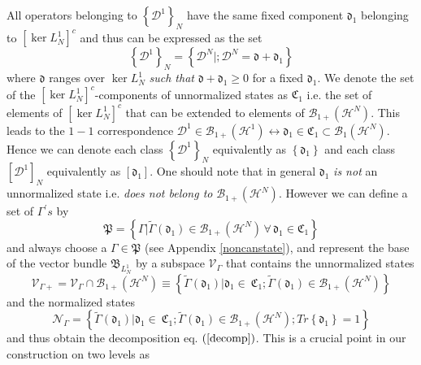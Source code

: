 \documentclass[aps,preprint]{revtex4}%
\begin{document}
All operators belonging to $\left\{  \mathcal{D}^{1}\right\}  _{N}$ have the
same fixed component $\mathfrak{d}_{1}$ belonging to $\left[  \ker L_{N}%
^{1}\right]  ^{c}$ and thus can be expressed as the set%
\begin{equation}
\left\{  \mathcal{D}^{1}\right\}  _{N}=\left\{  \mathcal{D}^{N}|;\mathcal{D}%
^{N}=\mathfrak{d}+\mathfrak{d}_{1}\right\}
\end{equation}
where $\mathfrak{d}$ ranges over $\ker L_{N}^{1}$ \emph{such that
}$\mathfrak{d}+\mathfrak{d}_{1}\geq0$ for a fixed $\mathfrak{d}_{1}$. We
denote the set of the $\left[  \ker L_{N}^{1}\right]  ^{c}$-components of
unnormalized states as $\mathfrak{C}_{1}$ i.e. the set of elements of $\left[
\ker L_{N}^{1}\right]  ^{c}$ that can be extended to elements of
$\mathcal{B}_{1+}\left(  \mathcal{H}^{N}\right)  $. This leads to the $1-1$
correspondence $\mathcal{D}^{1}\in\mathcal{B}_{1+}\left(  \mathcal{H}%
^{1}\right)  \leftrightarrow\mathfrak{d}_{1}\in\mathfrak{C}_{1}\subset
\mathcal{B}_{1}\left(  \mathcal{H}^{N}\right)  $. Hence we can denote each
class $\left\{  \mathcal{D}^{1}\right\}  _{N}$ equivalently as $\left\{
\mathfrak{d}_{1}\right\}  $ and each class $\left[  \mathcal{D}^{1}\right]
_{N}$ equivalently as $\left[  \mathfrak{d}_{1}\right]  $. One should note
that in general $\mathfrak{d}_{1}$ \emph{is not} an unnormalized state i.e.
\emph{does not belong to }$\mathcal{B}_{1+}\left(  \mathcal{H}^{N}\right)  $.
However we can define a set of $\Gamma^{\prime}s$ by
\begin{equation}
\mathfrak{P}=\left\{  \Gamma|\tilde{\Gamma}\left(  \mathfrak{d}_{1}\right)
\in\mathcal{B}_{1+}\left(  \mathcal{H}^{N}\right)  \,\forall\,\mathfrak{d}%
_{1}\in\mathfrak{C}_{1}\right\}
\end{equation}
and always choose a $\Gamma\in\mathfrak{P}$ (see Appendix \ref{noncanstate}),
and represent the base of the vector bundle $\mathfrak{B}_{L_{N}^{1}}$ by a
subspace $\mathcal{V}_{\Gamma}$ that contains the unnormalized states
\begin{equation}
\mathcal{V}_{\Gamma+}=\mathcal{V}_{\Gamma}\cap\mathcal{B}_{1+}\left(
\mathcal{H}^{N}\right)  \equiv\left\{  \tilde{\Gamma}\left(  \mathfrak{d}%
_{1}\right)  |\mathfrak{d}_{1}\in\ \mathfrak{C}_{1};\tilde{\Gamma}\left(
\mathfrak{d}_{1}\right)  \in\mathcal{B}_{1+}\left(  \mathcal{H}^{N}\right)
\right\}
\end{equation}
and the normalized states
\begin{equation}
\mathcal{N}_{\Gamma}=\left\{  \tilde{\Gamma}\left(  \mathfrak{d}_{1}\right)
|\mathfrak{d}_{1}\in\ \mathfrak{C}_{1};\tilde{\Gamma}\left(  \mathfrak{d}%
_{1}\right)  \in\mathcal{B}_{1+}\left(  \mathcal{H}^{N}\right)  ;Tr\left\{
\mathfrak{d}_{1}\right\}  =1\right\}  \label{NT}%
\end{equation}
and thus obtain the decomposition eq. $\left(  \ref{decomp}\right)  $. This is
a crucial point in our construction on two levels as
\end{document}
